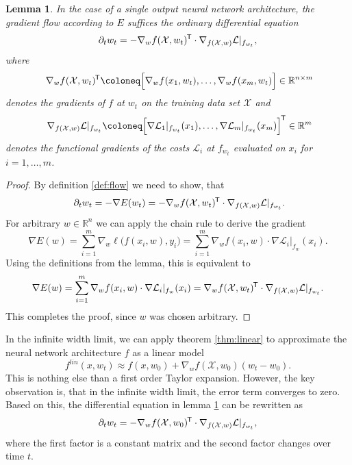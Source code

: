\documentclass[11pt, a4paper]{article}
\newtheorem{lemma}[theorem]{Lemma}
\newcommand{\R}{\mathbb{R}}
\newcommand{\X}{\mathcal{X}}
\renewcommand{\L}{\mathcal{L}}
\newcommand*{\tr}{^{\mkern-1.5mu\mathsf{T}}}
\begin{document}
\begin{lemma} \label{lem:flow}
In the case of a single output neural network architecture, the gradient flow according to $E$ suffices the ordinary differential equation
\[ \partial_tw_t = - \nabla_wf(\X, w_t)\tr  \cdot \nabla_{f(\X,w)} \L|_{f_{w_t}}, \]
where 
\[ \nabla_w f(\X, w_t)\tr  \coloneq \Big [ \nabla_wf(x_1,w_t), \dots, \nabla_wf(x_m, w_t) \Big ] \in \R^{n \times m} \]
denotes the gradients of $f$ at $w_t$ on the training data set $\X$ and 
\[ \nabla_{f(\X,w)} \L|_{f_{w_t}} \coloneq \Big [ \nabla \L_1|_{f_{w_t}}(x_1), \dots, \nabla \L_m|_{f_{w_t}}(x_m) \Big ]\tr  \in \R^m \]
denotes the functional gradients of the costs $\L_i$ at $f_{w_t}$ evaluated on $x_i$ for $i=1,\dots,m$.
\end{lemma}

\begin{proof}
By definition \ref{def:flow} we need to show, that
\[ \partial_t w_t = - \nabla E(w_t) = - \nabla_wf(\X, w_t)\tr  \cdot \nabla_{f(\X,w)} \L|_{f_{w_t}}. \]
For arbitrary $w \in \R^n$ we can apply the chain rule to derive the gradient
\[ \nabla E(w) = \sum_{i=1}^{m} \nabla_w \ell \big ( f(x_i,w), y_i \big ) = \sum_{i=1}^{m} \nabla_w f(x_i,w) \cdot \nabla \L_i |_{f_w}(x_i). \]
Using the definitions from the lemma, this is equivalent to
\[ \nabla E(w) = \sum_{i=1}^{m} \nabla_w f(x_i,w) \cdot \nabla \L_i |_{f_w}(x_i) = \nabla_wf(\X, w_t)\tr  \cdot \nabla_{f(\X,w)} \L|_{f_{w_t}}. \]
This completes the proof, since $w$ was chosen arbitrary.
\end{proof}

In the infinite width limit, we can apply theorem \ref{thm:linear} to approximate the neural network architecture $f$ as a linear model
\[ f^\textit{lin}(x, w_t) \approx f(x, w_0) + \nabla_wf(\X,w_0)(w_t-w_0). \]
This is nothing else than a first order Taylor expansion. However, the key observation is, that in the infinite width limit, the error term converges to zero. Based on this, the differential equation in lemma \ref{lem:flow} can be rewritten as
\[ \partial_tw_t = -\nabla_wf(\X,w_0)\tr  \cdot \nabla_{f(\X,w)} \L|_{f_{w_t}}, \]
where the first factor is a constant matrix and the second factor changes over time $t$. \\
\end{document}
